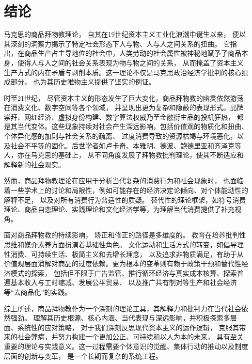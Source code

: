 \section{结论}
马克思的商品拜物教理论，
自其在19世纪资本主义工业化浪潮中诞生以来，
便以其深刻的洞察力揭示了特定社会形态下人与物、人与人之间关系的扭曲。
它指出，在商品生产占主导地位的社会中，人类劳动的社会属性被神秘地赋予了商品本身，使得人与人之间的社会关系表现为物与物之间的关系，
从而掩盖了资本主义生产方式的内在矛盾与剥削本质。这一理论不仅是马克思政治经济学批判的核心组成部分，
也为其历史唯物主义提供了坚实的例证。

时至21世纪，
尽管资本主义的形态发生了巨大变化，商品拜物教的幽灵依然游荡在消费文化、数字空间等各个领域，
并呈现出更为复杂和隐蔽的表现形式。品牌崇拜、网红经济、虚拟身份构建、数字算法权威乃至金融衍生品的投机狂热，
都是其当代变体。这些现象持续对社会产生深远影响，包括价值观的物质化和扭曲、个体异化感的加剧与社会关系的疏离、
过度消费导致的资源枯竭与环境恶化，以及社会不平等的固化。后世学者如卢卡奇、本雅明、德波、鲍德里亚和齐泽克等人，亦在马克思的基础上，
从不同角度发展了拜物教批判理论，使其不断适应和解释新的社会现实。

然而，商品拜物教理论在应用于分析当代复杂的消费行为和社会现象时，
也面临着一些学术上的讨论和局限性，例如可能存在的经济决定论倾向、对个体能动性的解释不足，
以及对所有消费行为普适性的质疑。
替代性的理论框架，如符号消费理论、商品自恋理论、实践理论和文化经济学等，为理解当代消费提供了补充视角。

面对商品拜物教的持续影响，
矫正和修正的路径是多维度的。
教育在培养批判性思维和媒介素养方面扮演着基础性角色。
文化运动和生活方式的转变，如倡导理性消费、可持续生活、极简主义和去增长理念，
以及追求非物质满足，有助于从价值观层面消解对商品的过度依赖。更为根本的变革则有赖于政策干预和替代性经济模式的探索，
包括但不限于广告监管、推行循环经济与真实成本核算、探索普遍基本收入与工时缩减、发展公平贸易、
以及推广共有制对等生产和社会经济等“去商品化”的实践。

综上所述，商品拜物教作为一个深刻的理论工具，其解释力和批判力在当代社会依然强劲。
理解其历史根源、核心内涵、当代表现与深远影响，并积极探索多层面、系统性的应对策略，
对于我们深刻反思现代资本主义的运作逻辑，
克服其带来的社会弊病，并努力构建一个更加公正、可持续和以人为本的未来，
具有至关重要的理论与实践意义。这一过程需要个体意识的觉醒、集体行动的推动以及制度层面的创新与变革，
是一个长期而复杂的系统工程。